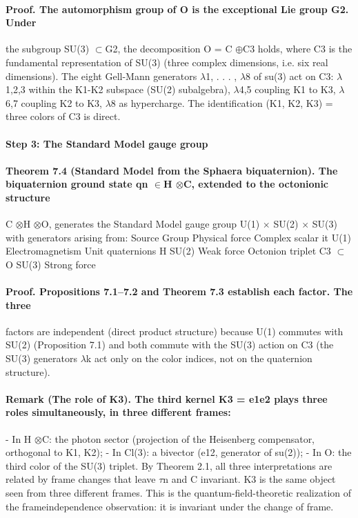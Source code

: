 \documentclass[12pt,a4paper]{article}
\begin{document}
\paragraph*{Proof. The automorphism group of O is the exceptional Lie group G2. Under}
the subgroup SU(3) $\subset$G2, the decomposition O = C $\oplus$C3 holds, where C3 is the fundamental representation of SU(3) (three complex dimensions, i.e. six real dimensions). The eight Gell-Mann generators $\lambda$1, . . . , $\lambda$8 of su(3) act on C3: $\lambda$1,2,3 within the K1-K2 subspace (SU(2) subalgebra), $\lambda$4,5 coupling K1 to K3, $\lambda$6,7 coupling K2 to K3, $\lambda$8 as hypercharge. The identification (K1, K2, K3) = three colors of C3 is direct.
\paragraph*{Step 3: The Standard Model gauge group}
\paragraph*{Theorem 7.4 (Standard Model from the Sphaera biquaternion). The biquaternion ground state qn $\in$H $\otimes$C, extended to the octonionic structure}
C $\otimes$H $\otimes$O, generates the Standard Model gauge group U(1) $\times$ SU(2) $\times$ SU(3) with generators arising from: Source Group Physical force Complex scalar it U(1) Electromagnetism Unit quaternions H SU(2) Weak force Octonion triplet C3 $\subset$O SU(3) Strong force
\paragraph*{Proof. Propositions 7.1--7.2 and Theorem 7.3 establish each factor. The three}
factors are independent (direct product structure) because U(1) commutes with SU(2) (Proposition 7.1) and both commute with the SU(3) action on C3 (the SU(3) generators $\lambda$k act only on the color indices, not on the quaternion structure).
\paragraph*{Remark (The role of K3). The third kernel K3 = e1e2 plays three roles simultaneously, in three different frames:}
- In H $\otimes$C: the photon sector (projection of the Heisenberg compensator,
orthogonal to K1, K2);
- In Cl(3): a bivector (e12, generator of su(2));
- In O: the third color of the SU(3) triplet.
By Theorem 2.1, all three interpretations are related by frame changes that leave $\tau$n and C invariant. K3 is the same object seen from three different frames. This is the quantum-field-theoretic realization of the frameindependence observation: it is invariant under the change of frame.
\end{document}
